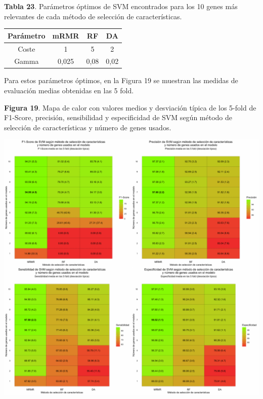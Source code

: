 \textbf{Tabla 23}. Parámetros óptimos de SVM encontrados para los 10 genes más relevantes de cada método de selección de características.

\begin{table}[H]
	\centering
	\begin{tabular}{cccc}
		\hline
		\textbf{Parámetro} & \textbf{mRMR} & \textbf{RF} & \textbf{DA} \\ \hline
		Coste                &    1 &    5     &   2       \\
		Gamma               &     0,025    &     0,08   & 0,02        \\ \hline
	\end{tabular}
\end{table}

Para estos parámetros óptimos, en la Figura 19 se muestran las medidas de evaluación medias obtenidas en las 5 fold.\\

\newpage
\begin{center}
\textbf{Figura 19}. Mapa de calor con valores medios y desviación típica de los 5-fold de F1-Score, precisión, sensibilidad y especificidad de SVM según método de selección de características y número de genes usados.
\end{center}
\begin{center}
	\includegraphics[width=1\textwidth]{figuras/19_higado_multiclase_heatmap_svm.pdf} 
\end{center}

